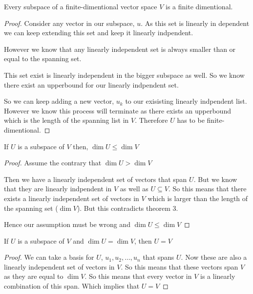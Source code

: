 \begin{lemma}
    Every subspace of a finite-dimentional vector space $V$ is a finite dimentional.
\end{lemma}
\begin{proof}
    Consider any vector in our subspace, $u$. As this set is linearly in dependent we can keep extending this set and keep it linearly indpendent.

    However we know that any linearly independent set is always smaller than or equal to the spanning set. 

    This set exist is linearly independent in the bigger subspace as well. So we know there exist an upperbound for our linearly indpendent set.    

    So we can keep adding a new vector, $u_k$ to our exisisting linearly indpendent list. However we know this process will terminate as there exists an upperbound which is the length of the spanning list in  $V$. Therefore  $U$ has to be finite-dimentional.
\end{proof}

\begin{lemma}
    If $U$ is a subspace of  $V$ then,  $\dim U \leq \dim V$
\end{lemma}
\begin{proof}
    Assume the contrary that $\dim U > \dim V$

    Then we have a linearly independent set of vectors that span $U$. But we know that they are linearly indpendent in $V$ as well as  $U \subseteq V$. So this means that there exists a linearly independent set of vectors in  $V$ which is larger than the length of the spanning set ($\dim V$). But this contradicts theorem 3.

    Hence our assumption must be wrong and  $\dim U \leq \dim V$
\end{proof}

\begin{lemma}
    If $U$ is a subspace of $V$ and $\dim U = \dim V$, then  $U = V$
\end{lemma}
\begin{proof}
    We can take a basis for $U$,  $u_1,u_2,\dots,u_n$  that spans $U$. Now these are also a linearly independent set of vectors in  $V$. So this means that these vectors span  $V$ as they are equal to  $\dim V$. So this means that every vector in  $V$ is a linearly combination of this span. Which implies that $U = V$

    
\end{proof}

